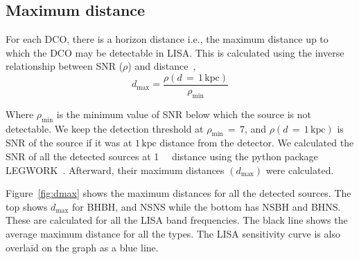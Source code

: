 \documentclass[journal, twocolumn]{IEEEtran}
\newcommand{\kpc}{\kilo\parsec}
\begin{document}
%

    \subsection{Maximum distance}\label{subsec:maximum-distance}
    For each DCO, there is a horizon distance i.e., the maximum distance up to which the DCO may be detectable in LISA. 
    This is calculated using the inverse relationship between SNR ($\rho$) and distance~\cite{Lau2020},
    \begin{equation}
        \label{eq:eq1}
        d_\text{max}=\frac{\rho(d\,=\,1\,\text{kpc})}{\rho_\text{min}}
    \end{equation}

    Where $\rho_{\min}$ is the minimum value of SNR below which the source is not detectable.
    We keep the detection threshold at $\rho_{\min}\,=\,7$, and $\rho(d\,=\,1\,\text{kpc})$ is SNR of the source if it was at $1\,\text{kpc}$ distance from the detector.
    We calculated the SNR of all the detected sources at \SI{1}{\kpc} distance using the python package LEGWORK~\cite{wagg2021legwork}.
    Afterward, their maximum distances $(d_{\max})$ were calculated.

    Figure~\ref{fig:dmax} shows the maximum distances for all the detected sources.
    The top shows $d_{\max}$ for BHBH, and NSNS while the bottom has NSBH and BHNS\@.
    These are calculated for all the LISA band frequencies.
    The black line shows the average maximum distance for all the types.
    The LISA sensitivity curve is also overlaid on the graph as a blue line.
\end{document}
